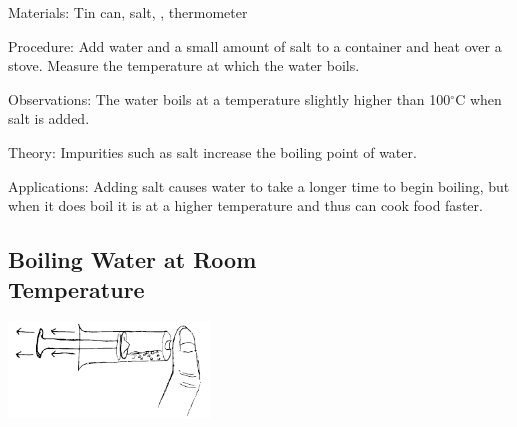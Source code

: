 \begin{multicols}{2}
\begin{description*}
\item[Materials:]{Tin can, salt, , thermometer}
\item[Procedure:]{Add water and a small amount of salt to a container and heat over a stove. Measure the temperature at which the water boils.}
\item[Observations:]{The water boils at a temperature slightly higher than 100$^\circ$C when salt is added.}
\item[Theory:]{Impurities such as salt increase the boiling point of water.}
\item[Applications:]{Adding salt causes water to take a longer time to begin boiling, but when it does boil it is at a higher temperature and thus can cook food faster.}
\end{description*}

\columnbreak

\subsection[Boiling Water at Room Temperature]{Boiling Water at Room \hfill \\ Temperature}

\begin{center}
\includegraphics[width=0.4\textwidth]{./img/boiling-room-temp.png}
\end{center}


\end{multicols}
